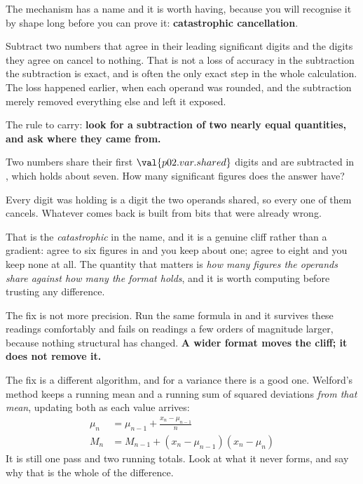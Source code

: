\begin{fr}
The mechanism has a name and it is worth having, because you will recognise it
by shape long before you can prove it: \textbf{catastrophic cancellation}.

Subtract two numbers that agree in their leading significant digits and the
digits they agree on cancel to nothing. That is not a loss of accuracy in the
subtraction \dash{} the subtraction is exact, and is often the only exact step
in the whole calculation. The loss happened earlier, when each operand was
rounded, and the subtraction merely removed everything else and left it
exposed.

\medskip
\noindent
The rule to carry: \textbf{look for a subtraction of two nearly equal
quantities, and ask where they came from.}
\end{fr}


\begin{fr}
Two numbers share their first $\val{p02.var.shared}$ digits and are
subtracted in , which holds about seven. How many significant
figures does the answer have?
\nextframe
\end{fr}

\begin{fr}
Every digit  was holding is a digit the two operands shared, so
every one of them cancels. Whatever comes back is built from bits that were
already wrong.

That is the \emph{catastrophic} in the name, and it is a genuine cliff rather than
a gradient: agree to six figures in  and you keep about one;
agree to eight and you keep none at all. The quantity that matters is
\emph{how many figures the operands share against how many the format holds},
and it is worth computing before trusting any difference.
\end{fr}


\begin{fr}
The fix is not more precision. Run the same formula in  and it
survives these readings comfortably \dash{} and fails on readings a few orders
of magnitude larger, because nothing structural has changed. \textbf{A wider
format moves the cliff; it does not remove it.}

The fix is a different algorithm, and for a variance there is a good one.
Welford's method keeps a running mean and a running sum of squared deviations
\emph{from that mean}, updating both as each value arrives:
\begin{align*}
  \mu_n &= \mu_{n-1} + \frac{x_n - \mu_{n-1}}{n} \\
  M_n &= M_{n-1} + (x_n - \mu_{n-1})(x_n - \mu_n)
\end{align*}
It is still one pass and two running totals. Look at what it never forms, and
say why that is the whole of the difference.
\nextframe
\end{fr}

